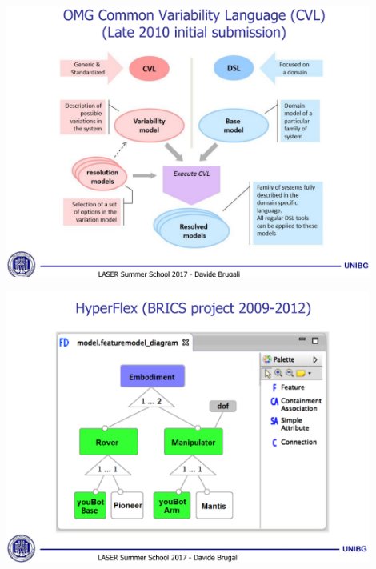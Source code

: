 \documentclass[xetex,mathserif,serif]{beamer}
\begin{document}
	\begin{frame}
		\begin{center}
			\includegraphics[width=0.9\textwidth]{brugali10.png}
		\end{center}
	\end{frame}

	\begin{frame}
		\begin{center}
			\includegraphics[width=0.9\textwidth]{brugali11.png}
		\end{center}
	\end{frame}
\end{document}
